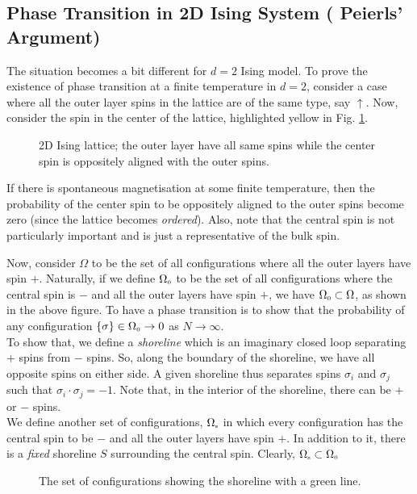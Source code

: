 \subsection{Phase Transition in 2D Ising System ( Peierls' Argument)}
The situation becomes a bit different for $d=2$ Ising model. To prove the existence of phase transition at a finite temperature in $d=2$, consider a case where all the outer layer spins in the lattice are of the same type, say $\uparrow$. Now, consider the spin in the center of the lattice, highlighted yellow in Fig. \ref{peirl1}.
\begin{figure}[H]
    \centering 
    
    \caption{2D Ising lattice; the outer layer have all same spins while the center spin is oppositely aligned with the outer spins.}
    \label{peirl1}
\end{figure}
\noindent
If there is spontaneous magnetisation at some finite temperature, then the probability of the center spin to be oppositely aligned to the outer spins become zero (since the lattice becomes \textit{ordered}). Also, note that the central spin is not particularly important and is just a representative of the bulk spin. 
\begin{figure}[H]
    \centering 
    
\end{figure} 
\noindent
Now, consider $\Omega$ to be the set of all configurations where all the outer layers have spin $+$. Naturally, if we define $\Omega_{\text{\tiny 0}}$ to be the set of all configurations where the central spin is $-$ and all the outer layers have spin $+$, we have $\Omega_{\text{\tiny 0}}\subset \Omega$, as shown in the above figure. To have a phase transition is to show that the probability of any configuration $\{\sigma\} \in \Omega_{\text{\tiny 0}} \to 0$ as $N\to \infty$. \\[0.2cm]
To show that, we define a \textit{shoreline} which is an imaginary closed loop separating $+$ spins from $-$ spins. So, along the boundary of the shoreline, we have all opposite spins on either side. A given shoreline thus separates spins $\sigma_i$ and $\sigma_j$ such that $\sigma_i\cdot \sigma_j = -1$. Note that, in the interior of the shoreline, there can be $+$ or $-$ spins.\\[0.2cm]
We define another set of configurations, $\Omega_{\text{\tiny s}}$ in which every configuration has the central spin to be $-$ and all the outer layers have spin $+$. In addition to it, there is a \textit{fixed} shoreline $S$ surrounding the central spin. Clearly, $\Omega_{\text{\tiny s}}\subset \Omega_{\text{\tiny 0}}$
\begin{figure}[H]
    \centering 
    
    \caption{The set of configurations showing the shoreline with a green line.}
    \label{peirl3}
\end{figure} 

